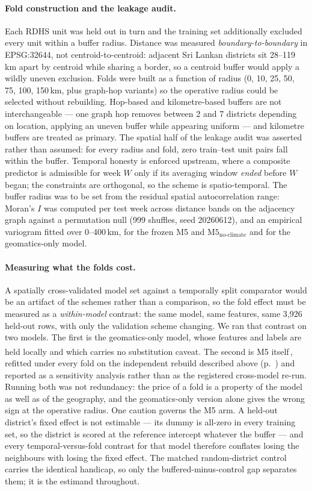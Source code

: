 \documentclass[11pt,a4paper]{article}
\providecommand{\REBUILD}{\textsuperscript{\ddag}}
\begin{document}
\paragraph{Fold construction and the leakage audit.} Each RDHS unit was held out in turn and the training set additionally excluded every unit within a buffer radius. Distance was measured \emph{boundary-to-boundary} in EPSG:32644, not centroid-to-centroid: adjacent Sri Lankan districts sit 28--119\,km apart by centroid while sharing a border, so a centroid buffer would apply a wildly uneven exclusion. Folds were built as a function of radius (0, 10, 25, 50, 75, 100, 150\,km, plus graph-hop variants) so the operative radius could be selected without rebuilding. Hop-based and kilometre-based buffers are not interchangeable --- one graph hop removes between 2 and 7 districts depending on location, applying an uneven buffer while appearing uniform --- and kilometre buffers are treated as primary. The spatial half of the leakage audit was asserted rather than assumed: for every radius and fold, zero train--test unit pairs fall within the buffer. Temporal honesty is enforced upstream, where a composite predictor is admissible for week $W$ only if its averaging window \emph{ended} before $W$ began; the constraints are orthogonal, so the scheme is spatio-temporal. The buffer radius was to be set from the residual spatial autocorrelation range: Moran's $I$ was computed per test week across distance bands on the adjacency graph against a permutation null (999 shuffles, seed 20260612), and an empirical variogram fitted over 0--400\,km, for the frozen M5 and $\text{M5}_{\text{no-climate}}$ and for the geomatics-only model.

\paragraph{Measuring what the folds cost.} A spatially cross-validated model set against a temporally split comparator would be an artifact of the schemes rather than a comparison, so the fold effect must be measured as a \emph{within-model} contrast: the same model, same features, same 3{,}926 held-out rows, with only the validation scheme changing. We ran that contrast on two models. The first is the geomatics-only model, whose features and labels are held locally and which carries no substitution caveat. The second is M5 itself\,\REBUILD, refitted under every fold on the independent rebuild described above (p.~\pageref{par:rebuild}) and reported as a sensitivity analysis rather than as the registered cross-model re-run. Running both was not redundancy: the price of a fold is a property of the model as well as of the geography, and the geomatics-only version alone gives the wrong sign at the operative radius. One caution governs the M5 arm. A held-out district's fixed effect is not estimable --- its dummy is all-zero in every training set, so the district is scored at the reference intercept whatever the buffer --- and every temporal-versus-fold contrast for that model therefore conflates losing the neighbours with losing the fixed effect. The matched random-district control carries the identical handicap, so only the buffered-minus-control gap separates them; it is the estimand throughout.
\end{document}
